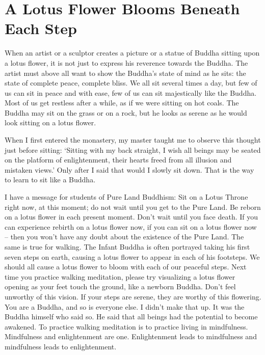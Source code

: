 \documentclass[a4paper,12pt,twocolumn]{article}
\begin{document}
   

  \section{A Lotus Flower Blooms Beneath Each Step}

  When an artist or a sculptor creates a picture or a statue of Buddha sitting upon a lotus flower, it is not just to express his reverence towards the Buddha.  The artist must above all want to show the Buddha’s state of mind as he sits: the state of complete peace, complete bliss.  We all sit several times a day, but few of us can sit in peace and with ease, few of us can sit majestically like the Buddha.  Most of us get restless after a while, as if we were sitting on hot coals.  The
  Buddha may sit on the grass or on a rock, but he looks as serene as he would look sitting on a lotus flower.

  When I first entered the monastery, my master taught me to observe this thought just before sitting: ‘Sitting with my back straight, I wish all beings may be seated on the platform of enlightenment, their hearts freed from all illusion and mistaken views.’  Only after I said that would I slowly sit down.  That is the way to learn to sit like a Buddha.

  I have a message for students of Pure Land Buddhism: Sit on a Lotus Throne right now, at this moment; do not wait until you get to the Pure Land.  Be reborn on a lotus flower in each present moment.  Don’t wait until you face death.  If you can experience rebirth on a lotus flower now, if you can sit on a lotus flower now – then you won’t have any doubt about the existence of the Pure Land.  The same is true for walking.  The Infant Buddha is often portrayed taking his first seven steps
  on earth, causing a lotus flower to appear in each of his footsteps.  We should all cause a lotus flower to bloom with each of our peaceful steps.  Next time you practice walking meditation, please try visualizing a lotus flower opening as your feet touch the ground, like a newborn Buddha.  Don’t feel unworthy of this vision.  If your steps are serene, they are worthy of this flowering.  You are a Buddha, and so is everyone else.  I didn’t make that up.  It was the Buddha himself who
  said so.  He said that all beings had the potential to become awakened.  To practice walking meditation is to practice living in mindfulness.  Mindfulness and enlightenment are one.  Enlightenment leads to mindfulness and mindfulness leads to enlightenment.
\end{document}
